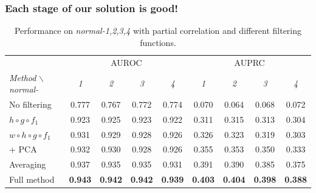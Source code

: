 \documentclass[final]{beamer}
\begin{document}

\begin{frame}
\frametitle{Each stage of our solution is good!}


\begin{table}[t]
\caption{Performance on \textit{normal-1,2,3,4} with partial correlation and different filtering functions.}
\label{tab:comparison}
\centering
\tiny
\begin{tabular}{| l | c c c c | c c c c |}
\hline
& \multicolumn{4}{c|}{AUROC} & \multicolumn{4}{c|}{AUPRC} \\
\textit{Method} $\backslash$ \textit{normal-} & \textit{1} & \textit{2} & \textit{3} & \textit{4} & \textit{1} & \textit{2} & \textit{3} & \textit{4} \\
\hline
\hline
No  filtering       					& 0.777 & 0.767 & 0.772 & 0.774 & 0.070 & 0.064 & 0.068 & 0.072\\
$ h \circ g \circ f_1$                  & 0.923 & 0.925 & 0.923 & 0.922 & 0.311 & 0.315 & 0.313 & 0.304\\
$ w \circ h \circ g \circ f_1$          & 0.931 & 0.929 & 0.928 & 0.926 & 0.326 & 0.323 & 0.319 & 0.303\\
+ PCA         							& 0.932 & 0.930 & 0.928 & 0.926 & 0.355 & 0.353 & 0.350 & 0.333\\
Averaging           					& 0.937 & 0.935 & 0.935 & 0.931 & 0.391 &  0.390 &  0.385 & 0.375\\
Full method           					& \textbf{0.943} & \textbf{0.942} & \textbf{0.942} & \textbf{0.939} & \textbf{0.403} & \textbf{0.404} & \textbf{0.398} & \textbf{0.388}\\
\hline
\end{tabular}
\end{table}



\end{frame}

\end{document}
